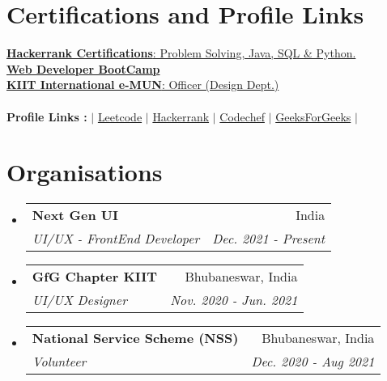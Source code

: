 \documentclass[letterpaper,11pt]{article}
\makeatletter
\newcommand{\resumeItem}[2]{
  \item\small{
    \textbf{#1}{ #2 \vspace{-2pt}}
  }
}
\newcommand{\resumeSubheading}[4]{
  \vspace{-1pt}\item
    \begin{tabular*}{0.97\textwidth}[t]{l@{\extracolsep{\fill}}r}
      \textbf{#1} & #2 \\
      \textit{\small#3} & \textit{\small #4} \\
    \end{tabular*}\vspace{-5pt}
}
\newcommand{\resumeSubHeadingListStart}{\begin{itemize}[leftmargin=*]}
\newcommand{\resumeSubHeadingListEnd}{\end{itemize}}
\newcommand{\resumeItemListStart}{\begin{itemize}}
\newcommand{\resumeItemListEnd}{\end{itemize}\vspace{-5pt}}
\makeatother
\begin{document}
\section{Certifications and Profile Links}
 \begin{itemize}[leftmargin=0.15in, label={}]
	\small{\item{
		\href{https://www.hackerrank.com/certificates/a64619ef6646}{\textbf{Hackerrank Certifications}{: Problem Solving, Java, SQL & Python.}} \\
 	    \href{https://www.udemy.com/certificate/UC-1adcc95f-c44b-49e7-8a39-75b9e84a3350/}{\textbf{Web Developer BootCamp}} \\
 	    \href{https://drive.google.com/file/d/1gAJfSQNtBdIQe9vkkxHTb0J2uGw_tLmb/view}{\textbf{KIIT International e-MUN}{: Officer (Design Dept.)}} \\
 	    \  \ \\
 	    \textbf{Profile Links :}{ $|$ \href{https://leetcode.com/satyajeetramnit2708/}{{Leetcode}} $|$ \href{https://www.hackerrank.com/satyajeetramnit1?hr_r=1}{{Hackerrank}} $|$ \href{https://www.codechef.com/users/ramnit_code_27}{{Codechef}} $|$ \href{https://auth.geeksforgeeks.org/user/satyajeetramnit27/practice/}{{GeeksForGeeks}} $|$} \\
	}}
 \end{itemize}
 \vspace{-16pt}


\section{Organisations}
\resumeSubHeadingListStart
  \resumeSubheading
      {Next Gen UI}{India}
      {UI/UX - FrontEnd Developer}{Dec. 2021 - Present}
    \resumeSubheading
      {GfG Chapter KIIT}{Bhubaneswar, India}
      {UI/UX Designer}{Nov. 2020 - Jun. 2021}
    \resumeSubheading
      {National Service Scheme (NSS)}{Bhubaneswar, India}
      {Volunteer}{Dec. 2020 - Aug 2021}
\resumeSubHeadingListEnd




%


\end{document}
